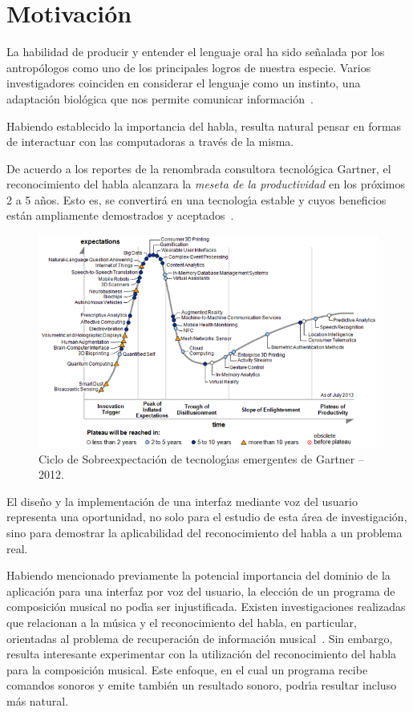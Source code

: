 \section{Motivaci\'on}
\label{sec:motivacion}

La habilidad de producir y entender el lenguaje oral ha sido se\~nalada por los antrop\'ologos
como uno de los principales logros de nuestra especie. Varios investigadores coinciden
en considerar el lenguaje como un instinto, una adaptaci\'on biol\'ogica que nos permite
comunicar \mbox{informaci\'on \cite{GabrielVoice2007}}.

Habiendo establecido la importancia del habla, resulta natural pensar en formas de
interactuar con las computadoras a trav\'es de la misma.

De acuerdo a los reportes de la renombrada consultora tecnol\'ogica Gartner, el reconocimiento
del habla alcanzara la  \emph{meseta de la productividad} en los pr\'oximos 2 a 5 a\~nos. Esto es,
se convertir\'a en una tecnolog{\'\i}a estable y cuyos beneficios est\'an ampliamente demostrados
y \mbox{aceptados \cite{Gartner2013}}.

\begin{figure}[ht]
\centering
\includegraphics[width=0.8\linewidth]{./graphics/gartner.png}
\caption{Ciclo de Sobreexpectaci\'on de tecnolog{\'\i}as emergentes de Gartner -- 2012.}
\label{figure:gartner}
\end{figure}

El dise\~no y la implementaci\'on de una interfaz mediante voz del usuario representa
una oportunidad, no solo para el estudio de esta \'area de investigaci\'on, sino para
demostrar la aplicabilidad del reconocimiento del habla a un problema real.

Habiendo mencionado previamente la potencial importancia del dominio de la aplicaci\'on
para una interfaz por voz del usuario, la elecci\'on de un programa de composici\'on musical
no pod{\'\i}a ser injustificada.
Existen investigaciones realizadas que relacionan a la m\'usica y el reconocimiento
del habla, en particular, orientadas al problema de recuperaci\'on de informaci\'on
\mbox{musical \cite{Goto2004Speech, Schuller2003Hybrid}}.
Sin embargo, resulta interesante experimentar con la utilizaci\'on del reconocimiento
del habla para la composici\'on musical. Este enfoque, en el cual un programa recibe comandos
sonoros y emite tambi\'en un resultado sonoro, podr{\'\i}a resultar incluso m\'as natural.

